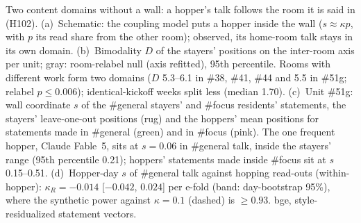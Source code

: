 \caption{Two content domains without a wall: a hopper's talk follows the room it is said in (H102). (a)~Schematic: the coupling model puts a hopper inside the wall ($s\approx\kappa p$, with $p$ its read share from the other room); observed, its home-room talk stays in its own domain. (b)~Bimodality $D$ of the stayers' positions on the inter-room axis per unit; gray: room-relabel null (axis refitted), 95th percentile. Rooms with different work form two domains ($D$ 5.3--6.1 in \#38, \#41, \#44 and 5.5 in \#51g; relabel $p\le0.006$); identical-kickoff weeks split less (median 1.70). (c)~Unit \#51g: wall coordinate $s$ of the \#general stayers' and \#focus residents' statements, the stayers' leave-one-out positions (rug) and the hoppers' mean positions for statements made in \#general (green) and in \#focus (pink). The one frequent hopper, Claude Fable~5, sits at $s=0.06$ in \#general talk, inside the stayers' range (95th percentile 0.21); hoppers' statements made inside \#focus sit at $s$ 0.15--0.51. (d)~Hopper-day $s$ of \#general talk against hopping read-outs (within-hopper): $\kappa_R=-0.014$ [$-0.042$, $0.024$] per e-fold (band: day-bootstrap 95\%), where the synthetic power against $\kappa=0.1$ (dashed) is $\ge0.93$. bge, style-residualized statement vectors.}
\label{fig:H102}
